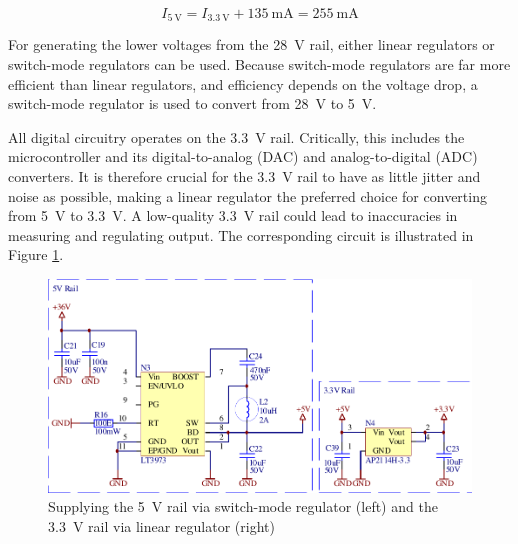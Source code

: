 \begin{equation}
    I_{\SI{5}{\volt}} = I_{\SI{3.3}{\volt}} + \SI{135}{\milli\ampere} = \SI{255}{\milli\ampere}
\end{equation}


For  generating  the  lower  voltages from  the  \SI{28}{\volt}  rail,  either
linear regulators  or switch-mode regulators can  be used. Because switch-mode
regulators  are far  more  efficient than  linear  regulators, and  efficiency
depends on the  voltage drop, a switch-mode regulator is  used to convert from
\SI{28}{\volt} to \SI{5}{\volt}.

All  digital  circuitry  operates  on  the  \SI{3.3}{\volt}  rail. Critically,
this  includes  the  microcontroller   and  its  digital-to-analog  (DAC)  and
analog-to-digital   (ADC)  converters. It   is  therefore   crucial  for   the
\SI{3.3}{\volt} rail to have as little  jitter and noise as possible, making a
linear regulator  the preferred  choice for  converting from  \SI{5}{\volt} to
\SI{3.3}{\volt}. A low-quality \SI{3.3}{\volt} rail could lead to inaccuracies
in measuring and regulating output.   The corresponding circuit is illustrated
in Figure \ref{fig:circuit:rails}.


\begin{figure}[th!]
    \center
    \includegraphics[width=.67\textwidth]{images/circuit/5v-3v-rails.pdf}
    \caption{Supplying the \SI{5}{\volt} rail via switch-mode regulator (left) and the \SI{3.3}{\volt} rail via linear regulator (right)}
    \label{fig:circuit:rails}
\end{figure}

